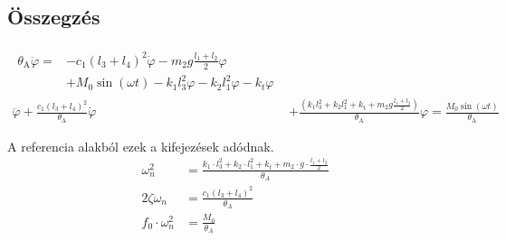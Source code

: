 \newpage
\subsection{Összegzés}
\begin{align}
    \begin{split}
        \theta_{\text{A}} \ddot{\varphi} ={} & -c_1(l_3+l_4)^2 \dot{\varphi} - m_2 g \frac{l_1+l_2}{2} \varphi \\
        & + M_0 \sin(\omega t) - k_1 l_3^2 \varphi - k_2 l_1^2 \varphi - k_t \varphi
    \end{split}                                                                      \\[2ex]
    \ddot{\varphi} + \frac{c_1(l_3+l_4)^2}{\theta_{\text{A}}} \dot{\varphi} & + \frac{\left(k_1 l_3^2 + k_2 l_1^2 + k_{\text{t}} + m_2 g \frac{l_1+l_2}{2}\right)}{\theta_{\text{A}}} \varphi
    = \frac{M_0 \sin(\omega t)}{\theta_{\text{A}}}
\end{align}

A referencia alakból ezek a kifejezések adódnak.
\begin{align}
    \omega_n^2           & = \frac{k_1 \cdot l_3^2 + k_2 \cdot l_1^2 + k_t + m_2 \cdot g \cdot \frac{l_1 + l_2}{2}}{\theta_A} \\[1ex]
    2\zeta\omega_n       & = \frac{c_1(l_3 + l_4)^2}{\theta_A}                                                                \\[1ex]
    f_0 \cdot \omega_n^2 & = \frac{M_0}{\theta_A}
\end{align}